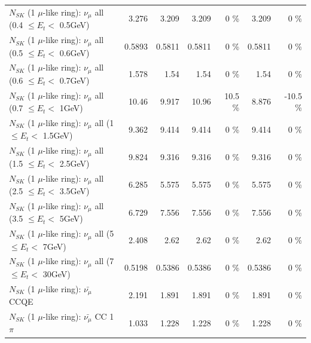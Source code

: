 \begin{table}
\begin{tabular}{| l | r | r | r  r | r  r |}
       $N_{SK}$ (1 $\mu$-like ring): $\nu_{\mu}$ all (0.4 $\leq E_{t} <$ 0.5GeV) &           3.276 &           3.209 &           3.209 &        0 \%  &           3.209 &        0 \%  \\ 
       $N_{SK}$ (1 $\mu$-like ring): $\nu_{\mu}$ all (0.5 $\leq E_{t} <$ 0.6GeV) &          0.5893 &          0.5811 &          0.5811 &        0 \%  &          0.5811 &        0 \%  \\ 
       $N_{SK}$ (1 $\mu$-like ring): $\nu_{\mu}$ all (0.6 $\leq E_{t} <$ 0.7GeV) &           1.578 &            1.54 &            1.54 &        0 \%  &            1.54 &        0 \%  \\ 
         $N_{SK}$ (1 $\mu$-like ring): $\nu_{\mu}$ all (0.7 $\leq E_{t} <$ 1GeV) &           10.46 &           9.917 &           10.96 &     10.5 \%  &           8.876 &    -10.5 \%  \\ 
         $N_{SK}$ (1 $\mu$-like ring): $\nu_{\mu}$ all (1 $\leq E_{t} <$ 1.5GeV) &           9.362 &           9.414 &           9.414 &        0 \%  &           9.414 &        0 \%  \\ 
       $N_{SK}$ (1 $\mu$-like ring): $\nu_{\mu}$ all (1.5 $\leq E_{t} <$ 2.5GeV) &           9.824 &           9.316 &           9.316 &        0 \%  &           9.316 &        0 \%  \\ 
       $N_{SK}$ (1 $\mu$-like ring): $\nu_{\mu}$ all (2.5 $\leq E_{t} <$ 3.5GeV) &           6.285 &           5.575 &           5.575 &        0 \%  &           5.575 &        0 \%  \\ 
         $N_{SK}$ (1 $\mu$-like ring): $\nu_{\mu}$ all (3.5 $\leq E_{t} <$ 5GeV) &           6.729 &           7.556 &           7.556 &        0 \%  &           7.556 &        0 \%  \\ 
           $N_{SK}$ (1 $\mu$-like ring): $\nu_{\mu}$ all (5 $\leq E_{t} <$ 7GeV) &           2.408 &            2.62 &            2.62 &        0 \%  &            2.62 &        0 \%  \\ 
          $N_{SK}$ (1 $\mu$-like ring): $\nu_{\mu}$ all (7 $\leq E_{t} <$ 30GeV) &          0.5198 &          0.5386 &          0.5386 &        0 \%  &          0.5386 &        0 \%  \\ 
\hline
\hline
\hline
                              $N_{SK}$ (1 $\mu$-like ring): $\bar{\nu_\mu}$ CCQE &           2.191 &           1.891 &           1.891 &        0 \%  &           1.891 &        0 \%  \\ 
                         $N_{SK}$ (1 $\mu$-like ring): $\bar{\nu_\mu}$ CC 1$\pi$ &           1.033 &           1.228 &           1.228 &        0 \%  &           1.228 &        0 \%  \\ 

\end{tabular}
\end{table}
